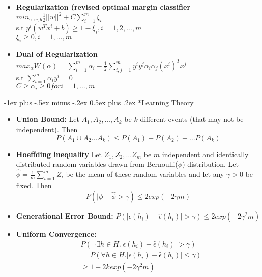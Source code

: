\documentclass[10pt,landscape]{article}
\makeatletter
\renewcommand{\section}{\@startsection{section}{1}{0mm}%
                                {-1ex plus -.5ex minus -.2ex}%
                                {0.5ex plus .2ex}%
                                {\normalfont\large\bfseries}}
\makeatother
\begin{document}
\begin{multicols}{3}
\begin{itemize}
\item \textbf{Regularization (revised optimal margin classifier}\\$min_{\gamma, w, b} \frac{1}{2} ||w||^2 + C\sum_{i = 1}^{m}\xi_i $\\
s.t $y^i(w^Tx^i +b) \geq 1-\xi_i, i = 1, 2, \dots, m$ \\
$\xi_i \geq 0, i = 1, \dots, m$\\
\item \textbf{Dual of Regularization} \\
$max_\alpha W(\alpha) = \sum_{i = 1}^{m}\alpha_i - \frac{1}{2}\sum_{i, j = 1}^{m}y^i y^j \alpha_i \alpha_j (x^i)^Tx^j$\\
s.t $\sum_{i = 1}^{m}\alpha_i y^i = 0$\\
$C \geq \alpha_i \geq 0 for i = 1, \dots, m$
\end{itemize}
\section*{Learning Theory}
\begin{itemize}
\item \textbf{Union Bound:} Let $A_1, A_2, \dots, A_k$ be $k$ different events (that may not be independent). Then 
$$P(A_1 \cup A_2\dots A_k) \leq P(A_1) + P(A_2) + \dots P(A_k)$$
\item \textbf{Hoeffding inequality} Let $Z_1, Z_2, \dots Z_m$ be $m$ independent and identically distributed random variables drawn from Bernoulli($\phi$) distribution. Let $\hat{\phi}  = \frac{1}{m}\sum_{i = 1}^{m}Z_i$ be the mean of these random variables and let any $\gamma >0$ be fixed. Then 
$$P(|\phi - \hat{\phi}>\gamma ) \leq 2exp(-2\gamma m)$$
\item \textbf{Generational Error Bound:} $P(|\epsilon(h_i) - \hat{\epsilon}(h_i)| > \gamma) \leq 2exp(-2\gamma^2m)$
\item \textbf{Uniform Convergence:} \\
\begin{align*}
&P(\neg \exists h \in H. |\epsilon(h_i) - \hat{\epsilon}(h_i)| > \gamma) \\
&= P(\forall h \in H. |\epsilon(h_i) - \hat{\epsilon}(h_i)| \leq \gamma)\\
& \geq 1- 2k exp(-2\gamma^2m)
\end{align*}


\end{itemize}
\end{multicols}
\end{document}
